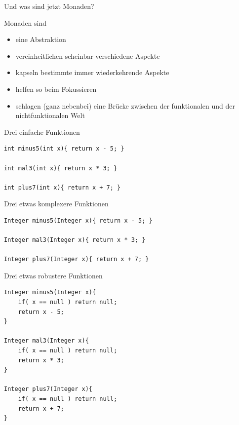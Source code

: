 \begin{frame}[fragile]{Und was sind jetzt Monaden?}

Monaden sind
\begin{itemize}
\item eine Abstraktion
\item vereinheitlichen scheinbar verschiedene Aspekte
\item kapseln bestimmte immer wiederkehrende Aspekte
\item helfen so beim Fokussieren
\item schlagen (ganz nebenbei) eine Brücke zwischen der funktionalen und der nichtfunktionalen Welt
\end{itemize}

\end{frame}


\begin{frame}[fragile]{Drei einfache Funktionen}
\begin{lstlisting}
int minus5(int x){ return x - 5; }
	
int mal3(int x){ return x * 3; }
	
int plus7(int x){ return x + 7; }
\end{lstlisting}
\end{frame}

\begin{frame}[fragile]{Drei etwas komplexere Funktionen}
\begin{lstlisting}
Integer minus5(Integer x){ return x - 5; }
	
Integer mal3(Integer x){ return x * 3; }
	
Integer plus7(Integer x){ return x + 7; }
\end{lstlisting}
\end{frame}

\begin{frame}[fragile]{Drei etwas robustere Funktionen}
\begin{lstlisting}
Integer minus5(Integer x){
    if( x == null ) return null;
    return x - 5; 
}
	
Integer mal3(Integer x){ 
    if( x == null ) return null;
    return x * 3; 
}
	
Integer plus7(Integer x){ 
    if( x == null ) return null;
    return x + 7; 
}
\end{lstlisting}
\end{frame}

